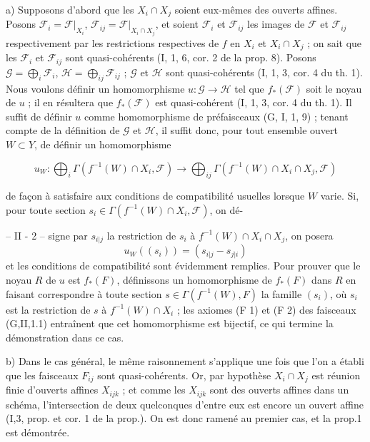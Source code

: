 a) Supposons d'abord que les $X_i \cap X_j$ soient eux-mêmes des ouverts affines. Posons $\mathcal{F}_i = \mathcal{F}|_{X_i}$, $\mathcal{F}_{ij} = \mathcal{F}|_{X_i \cap X_j}$, et soient $\mathcal{F}_i$ et $\mathcal{F}_{ij}$ les images de $\mathcal{F}$ et $\mathcal{F}_{ij}$ respectivement par les restrictions respectives de $f$ en $X_i$ et $X_i \cap X_j$ ; on sait que les $\mathcal{F}_i$ et $\mathcal{F}_{ij}$ sont quasi-cohérents (I, 1, 6, cor. 2 de la prop. 8). Posons $\mathcal{G} = \bigoplus_i \mathcal{F}_i$, $\mathcal{H} = \bigoplus_{ij} \mathcal{F}_{ij}$ ; $\mathcal{G}$ et $\mathcal{H}$ sont quasi-cohérents (I, 1, 3, cor. 4 du th. 1). Nous voulons définir un homomorphisme $u : \mathcal{G} \to \mathcal{H}$ tel que $f_*(\mathcal{F})$ soit le noyau de $u$ ; il en résultera que $f_*(\mathcal{F})$ est quasi-cohérent (I, 1, 3, cor. 4 du th. 1). Il suffit de définir $u$ comme homomorphisme de préfaisceaux (G, I, 1, 9) ; tenant compte de la définition de $\mathcal{G}$ et $\mathcal{H}$, il suffit donc, pour tout ensemble ouvert $W \subset Y$, de définir un homomorphisme

$$u_W : \bigoplus_i \Gamma(f^{-1}(W) \cap X_i, \mathcal{F}) \to \bigoplus_{ij} \Gamma(f^{-1}(W) \cap X_i \cap X_j, \mathcal{F})$$

de façon à satisfaire aux conditions de compatibilité usuelles lorsque $W$ varie. Si, pour toute section $s_i \in \Gamma(f^{-1}(W) \cap X_i, \mathcal{F})$, on dé-

\newpage


-- II - 2 --
signe par $s_{i|j}$ la restriction de $s_i$ à $f^{-1}(W) \cap X_i \cap X_j$, on posera
$$u_W((s_i)) = (s_{i|j} - s_{j|i})$$
et les conditions de compatibilité sont évidemment remplies. Pour prouver que le noyau $R$ de $u$ est $f_*(F)$, définissons un homomorphisme de $f_*(F)$ dans $R$ en faisant correspondre à toute section $s \in \Gamma(f^{-1}(W), F)$ la famille $(s_i)$, où $s_i$ est la restriction de $s$ à $f^{-1}(W) \cap X_i$ ; les axiomes (F 1) et (F 2) des faisceaux (G,II,1.1) entraînent que cet homomorphisme est bijectif, ce qui termine la démonstration dans ce cas.

b) Dans le cas général, le même raisonnement s'applique une fois que l'on a établi que les faisceaux $F_{ij}$ sont quasi-cohérents. Or, par hypothèse $X_i \cap X_j$ est réunion finie d'ouverts affines $X_{ijk}$ ; et comme les $X_{ijk}$ sont des ouverts affines dans un schéma, l'intersection de deux quelconques d'entre eux est encore un ouvert affine (I,3, prop. et cor. 1 de la prop.). On est donc ramené au premier cas, et la prop.1 est démontrée.

